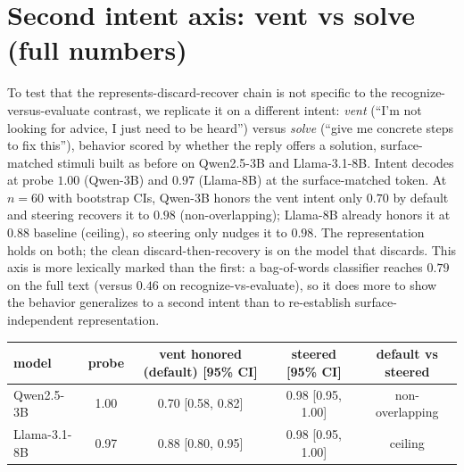 \documentclass[11pt]{article}
\begin{document}
\section{Second intent axis: vent vs solve (full numbers)}
\label{app:axis2}
To test that the represents-discard-recover chain is not specific to the recognize-versus-evaluate contrast, we
replicate it on a different intent: \emph{vent} (``I'm not looking for advice, I just need to be heard'') versus
\emph{solve} (``give me concrete steps to fix this''), behavior scored by whether the reply offers a solution,
surface-matched stimuli built as before on Qwen2.5-3B and Llama-3.1-8B. Intent decodes at probe $1.00$ (Qwen-3B)
and $0.97$ (Llama-8B) at the surface-matched token. At $n{=}60$ with bootstrap CIs, Qwen-3B honors the vent
intent only $0.70$ by default and steering recovers it to $0.98$ (non-overlapping); Llama-8B already honors it
at $0.88$ baseline (ceiling), so steering only nudges it to $0.98$. The representation holds on both; the clean
discard-then-recovery is on the model that discards. This axis is more lexically marked than the first: a
bag-of-words classifier reaches $0.79$ on the full text (versus $0.46$ on recognize-vs-evaluate), so it does
more to show the behavior generalizes to a second intent than to re-establish surface-independent
representation.

\begin{center}\small
\begin{tabular}{lcccc}
\toprule
model & probe & vent honored (default) [95\% CI] & steered [95\% CI] & default vs steered \\
\midrule
Qwen2.5-3B   & 1.00 & 0.70 [0.58, 0.82] & 0.98 [0.95, 1.00] & non-overlapping \\
Llama-3.1-8B & 0.97 & 0.88 [0.80, 0.95] & 0.98 [0.95, 1.00] & ceiling \\
\bottomrule
\end{tabular}
\end{center}
\end{document}
